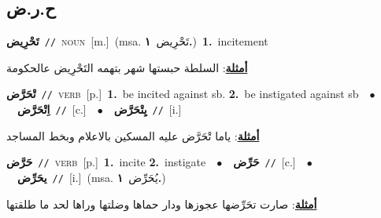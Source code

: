 \documentclass[10pt,a4paper,twoside]{article} %
\begin{document}
\begin{multicols}{2}
\vspace{-3mm}
\subsection*{\color{blue}\foreignlanguage{arabic}{ح.ر.ض}\color{blue}{}} 

{\setlength\topsep{0pt}\textbf{\foreignlanguage{arabic}{تَحْرِيض}}\ {\color{gray}\texttt{//}\color{black}}\ \textsc{noun}\ [m.]\ \color{gray}(msa. \foreignlanguage{arabic}{تَحْرِيض}~\foreignlanguage{arabic}{\textbf{١.}})\color{black}\ \textbf{1.}~incitement\  \begin{flushright}\color{gray}\foreignlanguage{arabic}{\textbf{\underline{\foreignlanguage{arabic}{أمثلة}}}: السلطة حبستها شهر بتهمه التَحْرِيض عالحكومة}\end{flushright}\color{black}} \vspace{2mm}

{\setlength\topsep{0pt}\textbf{\foreignlanguage{arabic}{تْحَرَّض}}\ {\color{gray}\texttt{//}\color{black}}\ \textsc{verb}\ [p.]\ \textbf{1.}~be incited against sb.  \textbf{2.}~be instigated against sb\ \ $\bullet$\ \ \setlength\topsep{0pt}\textbf{\foreignlanguage{arabic}{اِتْحَرَّض}}\ {\color{gray}\texttt{//}\color{black}}\ [c.]\ \ $\bullet$\ \ \setlength\topsep{0pt}\textbf{\foreignlanguage{arabic}{يِتْحَرَّض}}\ {\color{gray}\texttt{//}\color{black}}\ [i.]\  \begin{flushright}\color{gray}\foreignlanguage{arabic}{\textbf{\underline{\foreignlanguage{arabic}{أمثلة}}}: ياما تْحَرَّض عليه المسكين بالاعلام وبخط المساجد}\end{flushright}\color{black}} \vspace{2mm}

{\setlength\topsep{0pt}\textbf{\foreignlanguage{arabic}{حَرَّض}}\ {\color{gray}\texttt{//}\color{black}}\ \textsc{verb}\ [p.]\ \textbf{1.}~incite  \textbf{2.}~instigate\ \ $\bullet$\ \ \setlength\topsep{0pt}\textbf{\foreignlanguage{arabic}{حَرِّض}}\ {\color{gray}\texttt{//}\color{black}}\ [c.]\ \ $\bullet$\ \ \setlength\topsep{0pt}\textbf{\foreignlanguage{arabic}{يحَرِّض}}\ {\color{gray}\texttt{//}\color{black}}\ [i.]\ \color{gray}(msa. \foreignlanguage{arabic}{يُحَرِّض}~\foreignlanguage{arabic}{\textbf{١.}})\color{black}\  \begin{flushright}\color{gray}\foreignlanguage{arabic}{\textbf{\underline{\foreignlanguage{arabic}{أمثلة}}}: صارت تحَرِّضها عجوزها ودار حماها وضلتها وراها لحد ما طلقتها}\end{flushright}\color{black}} \vspace{2mm}


\end{multicols}
\end{document}
